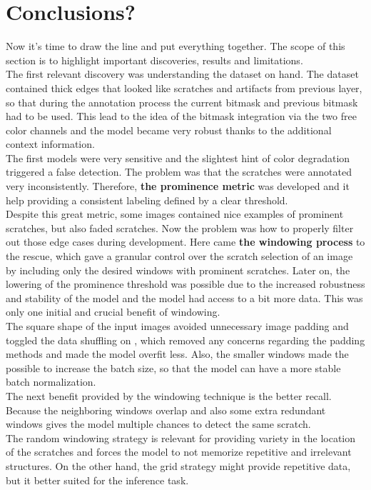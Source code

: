 \section{Conclusions?}
Now it's time to draw the line and put everything together. The scope of this section is to highlight important discoveries, results and limitations. \\
The first relevant discovery was understanding the dataset on hand. The dataset contained thick edges that looked like scratches and artifacts from previous layer, so that during the annotation process the current bitmask and previous bitmask had to be used. This lead to the idea of the bitmask integration via the two free color channels and the model became very robust thanks to the additional context information. \\
The first models were very sensitive and the slightest hint of color degradation triggered a false detection. The problem was that the scratches were annotated very inconsistently. Therefore, \textbf{the prominence metric} was developed and it help providing a consistent labeling defined by a clear threshold.\\
Despite this great metric, some images contained nice examples of prominent scratches, but also faded scratches. Now the problem was how to properly filter out those edge cases during development. Here came \textbf{the windowing process} to the rescue, which gave a granular control over the scratch selection of an image by including only the desired windows with prominent scratches. Later on, the lowering of the prominence threshold was possible due to the increased robustness and stability of the model and the model had access to a bit more data. This was only one initial and crucial benefit of windowing. \\
The square shape of the input images avoided unnecessary image padding and toggled the data shuffling on , which removed any concerns regarding the padding methods and made the model overfit less. Also, the smaller windows made the possible to increase the batch size, so that the model can have a more stable batch normalization. \\
The next benefit provided by the windowing technique is the better recall. Because the neighboring windows overlap and also some extra redundant windows gives the model multiple chances to detect the same scratch. \\
The random windowing strategy is relevant for providing variety in the location of the scratches and forces the model to not memorize repetitive and irrelevant structures. On the other hand, the grid strategy might provide repetitive data, but it better suited for the inference task. \\
